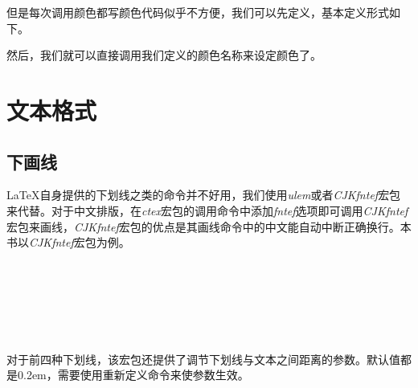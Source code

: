 \begin{latex}
\color[RGB]{204, 128, 92}{Color Text中文测试}
\end{latex}

但是每次调用颜色都写颜色代码似乎不方便，我们可以先定义，基本定义形式如下。
\begin{latex}
\usepackage{xcolor}									%
\end{latex}

然后，我们就可以直接调用我们定义的颜色名称来设定颜色了。

\begin{center}
\end{center}

\begin{latex}
\color{keyword}{\slshape function, return, if, true, false}
\end{latex}

\section{文本格式}

\subsection{下画线}

\LaTeX 自身提供的下划线之类的命令并不好用，我们使用\emph{ulem}或者\emph{CJKfntef}宏包来代替。对于中文排版，在\emph{ctex}宏包的调用命令中添加\emph{fntef}选项即可调用\emph{CJKfntef}宏包来画线，\emph{CJKfntef}宏包的优点是其画线命令中的中文能自动中断正确换行。本书以\emph{CJKfntef}宏包为例。

\begin{codeshow}
\\
\\
\\
\\
\\
\end{codeshow}

对于前四种下划线，该宏包还提供了调节下划线与文本之间距离的参数。默认值都是0.2em，需要使用重新定义命令来使参数生效。


